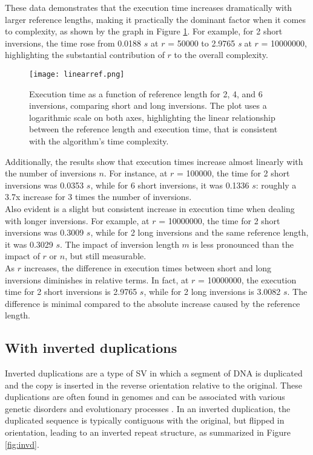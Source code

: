 These data demonstrates that the execution time increases dramatically with larger reference lengths, making it practically the dominant factor when it comes to complexity, as shown by the graph in Figure \ref{fig:refgraph}. For example, for 2 short inversions, the time rose from 0.0188 \( s \) at \( r \) = 50000 to 2.9765 \textit{s} at \( r \) = 10000000, highlighting the substantial contribution of \( r \) to the overall complexity. \\

\begin{figure}[h]

  \centering
    \texttt{[image: linearref.png]}

  \caption{Execution time as a function of reference length for 2, 4, and 6 inversions, comparing short and long inversions. The plot uses a logarithmic scale on both axes, highlighting the linear relationship between the reference length and execution time, that is consistent with the algorithm's time complexity.}
  \label{fig:refgraph}
\end{figure}

Additionally, the results show that execution times increase almost linearly with the number of inversions \( n \). For instance, at \( r \) = 100000, the time for 2 short inversions was 0.0353 \( s \), while for 6 short inversions, it was 0.1336 \( s \): roughly a 3.7x increase for 3 times the number of inversions.\\
Also evident is a slight but consistent increase in execution time when dealing with longer inversions. For example, at \( r \) = 10000000, the time for 2 short inversions was 0.3009 \( s \), while for 2 long inversions and the same reference length, it was 0.3029 \( s \). The impact of inversion length \( m \) is less pronounced than the impact of \( r \) or \( n \), but still measurable. \\
As \( r \) increases, the difference in execution times between short and long inversions diminishes in relative terms. In fact, at \( r \) = 10000000, the execution time for 2 short inversions is 2.9765 \( s \), while for 2 long inversions is 3.0082 \( s \). The difference is minimal compared to the absolute increase caused by the reference length.

\subsection{With inverted duplications}

Inverted duplications are a type of SV in which a segment of DNA is duplicated and the copy is inserted in the reverse orientation relative to the original. These duplications are often found in genomes and can be associated with various genetic disorders and evolutionary processes \cite{hermetz_large_2014}. In an inverted duplication, the duplicated sequence is typically contiguous with the original, but flipped in orientation, leading to an inverted repeat structure, as summarized in Figure \ref{fig:invd}.


